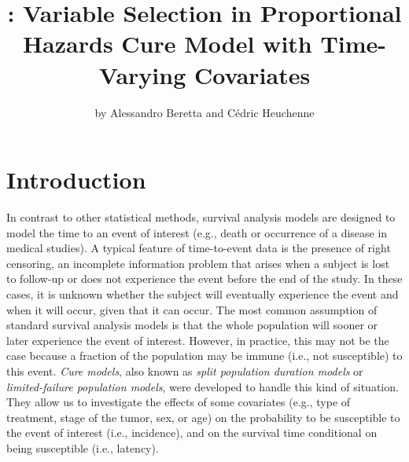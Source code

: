 \title{: Variable Selection in Proportional Hazards Cure Model with Time-Varying Covariates}
\author{by Alessandro Beretta and C\'edric Heuchenne}

\maketitle





\section{Introduction}
In contrast to other statistical methods, survival analysis models are designed to model the time to an event of interest (e.g., death or occurrence of a disease in medical studies). 
A typical feature of time-to-event data is the presence of right censoring,
an incomplete information problem that arises when a subject is lost to follow-up or does not experience the event before the end of the study. 
In these cases, it is unknown whether the subject will eventually experience the event and when it will occur, given that it can occur.
The most common assumption of standard survival analysis models is that the whole population will sooner or later experience the event of interest.
However, in practice, this may not be the case because a fraction of the population may be immune (i.e., not susceptible) to this event.
\emph{Cure models}, also known as \emph{split population duration models} or \emph{limited-failure population models}, were developed to handle this kind of situation.
They allow us to investigate the effects of some covariates (e.g., type of treatment, stage of the tumor, sex, or age) on the probability to be susceptible to the event of interest (i.e., incidence), and on the survival time conditional on being susceptible (i.e., latency).

